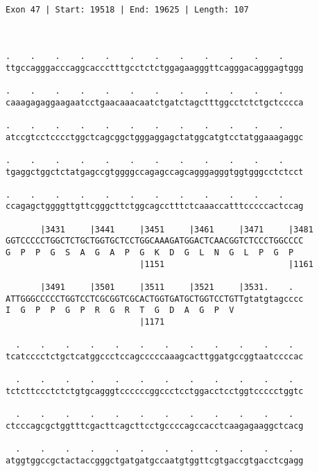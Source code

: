 \documentclass{article}
\begin{document}
\begin{Verbatim}
                                                       
 
Exon 47 | Start: 19518 | End: 19625 | Length: 107



.    .    .    .    .    .    .    .    .    .    .    .    
ttgccagggacccaggcaccctttgcctctctggagaagggttcagggacagggagtggg
                                                            
.    .    .    .    .    .    .    .    .    .    .    .    
caaagagaggaagaatcctgaacaaacaatctgatctagctttggcctctctgctcccca
                                                            
.    .    .    .    .    .    .    .    .    .    .    .    
atccgtcctcccctggctcagcggctgggaggagctatggcatgtcctatggaaagaggc
                                                            
.    .    .    .    .    .    .    .    .    .    .    .    
tgaggctggctctatgagccgtggggccagagccagcagggagggtggtgggcctctcct
                                                            
.    .    .    .    .    .    .    .    .    .    .    .    
ccagagctggggttgttcgggcttctggcagcctttctcaaaccatttcccccactccag
                                                            
       |3431     |3441     |3451     |3461     |3471     |3481
GGTCCCCCTGGCTCTGCTGGTGCTCCTGGCAAAGATGGACTCAACGGTCTCCCTGGCCCC
G  P  P  G  S  A  G  A  P  G  K  D  G  L  N  G  L  P  G  P  
                           |1151                         |1161
  
       |3491     |3501     |3511     |3521     |3531.    .  
ATTGGGCCCCCTGGTCCTCGCGGTCGCACTGGTGATGCTGGTCCTGTTgtatgtagcccc
I  G  P  P  G  P  R  G  R  T  G  D  A  G  P  V              
                           |1171                            
  
  .    .    .    .    .    .    .    .    .    .    .    .  
tcatcccctctgctcatggccctccagcccccaaagcacttggatgccggtaatccccac
                                                            
  .    .    .    .    .    .    .    .    .    .    .    .  
tctcttccctctctgtgcagggtccccccggccctcctggacctcctggtccccctggtc
                                                            
  .    .    .    .    .    .    .    .    .    .    .    .  
ctcccagcgctggtttcgacttcagcttcctgccccagccacctcaagagaaggctcacg
                                                            
  .    .    .    .    .    .    .    .    .    .    .    .  
atggtggccgctactaccgggctgatgatgccaatgtggttcgtgaccgtgacctcgagg
                                                            

\end{Verbatim}
\end{document}
